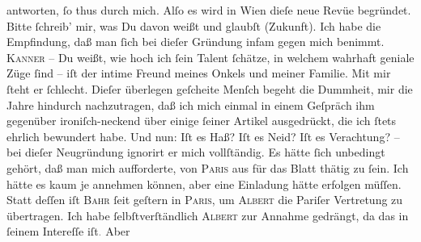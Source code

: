 \begin{ledgroupsized}[t]{13cm}
               antworten, ſo thus durch mich.\pend
           \pstart
           Alſo es \strikeout{\textcolor{gray}{wa}} wird in Wien dieſe neue Revüe begründet. Bitte ſchreib’ mir, was Du
               davon weißt und glaubſt (Zukunft). Ich habe die Empfindung, daß man ſich bei dieſer
               Gründung infam gegen mich benimmt. \textsc{Kanner} – Du weißt, wie hoch ich ſein Talent ſchätze, in welchem {\pb}wahrhaft geniale Züge ſind – iſt der intime Freund meines Onkels und meiner Familie. Mit
               mir ſteht er ſchlecht. Dieſer überlegen geſcheite Menſch begeht die Dummheit, mir die Jahre hindurch
               nachzutragen, daß ich mich einmal in einem Geſpräch  ihm gegenüber ironiſch-neckend über einige ſeiner Artikel ausgedrückt,
               die ich ſtets ehrlich bewundert habe. Und nun: Iſt es Haß? Iſt es Neid? Iſt es
               Verachtung? – bei dieſer Neugründung ignorirt er mich vollſtändig. Es hätte {\pb}ſich unbedingt gehört, daß man mich aufforderte, von
                  \textsc{Paris} aus für das Blatt thätig
               zu ſein. Ich hätte es kaum je annehmen können, aber eine Einladung hätte erfolgen
               müſſen. Statt deſſen iſt \textsc{Bahr} ſeit geſtern in \textsc{Paris}, um \textsc{Albert} die Pariſer Vertretung zu übertragen. Ich
               habe ſelbſtverſtändlich \textsc{Albert} zur Annahme gedrängt, da das in ſeinem Intereſſe iſt\textcolor{gray}{.} Aber

\end{ledgroupsized}

